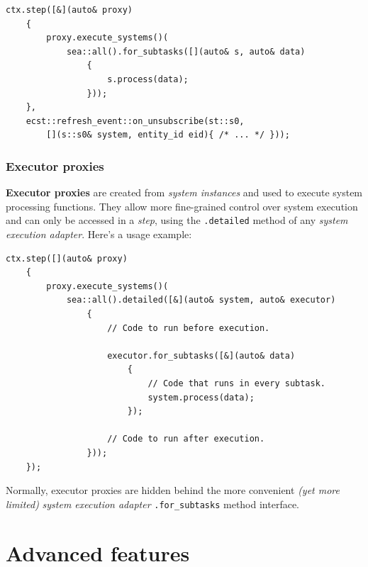 \documentclass[twoside, 12pt, a4paper, openright]{book}
\begin{document}
\begin{verbatim}
ctx.step([&](auto& proxy)
    {
        proxy.execute_systems()(
            sea::all().for_subtasks([](auto& s, auto& data)
                {
                    s.process(data);
                }));
    },
    ecst::refresh_event::on_unsubscribe(st::s0,
        [](s::s0& system, entity_id eid){ /* ... */ }));
\end{verbatim}

\subsection{Executor proxies}\label{executor-proxies}

\textbf{Executor proxies} are created from \emph{system instances} and
used to execute system processing functions. They allow more
fine-grained control over system execution and can only be accessed in a
\emph{step}, using the
\texttt{.detailed}
method of any \emph{system execution adapter}. Here's a usage example:

\begin{verbatim}
ctx.step([](auto& proxy)
    {
        proxy.execute_systems()(
            sea::all().detailed([&](auto& system, auto& executor)
                {
                    // Code to run before execution.

                    executor.for_subtasks([&](auto& data)
                        {
                            // Code that runs in every subtask.
                            system.process(data);
                        });

                    // Code to run after execution.
                }));
    });
\end{verbatim}

Normally, executor proxies are hidden behind the more convenient
\emph{(yet more limited)} \emph{system execution adapter}
\texttt{.for_subtasks}
method interface.

\hypertarget{chap_advfeats}{\chapter{Advanced
features}\label{chap_advfeats}}
\end{document}
